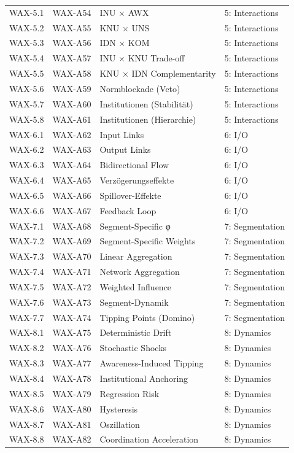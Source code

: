 \begin{longtable}{@{}llll@{}}
WAX-5.1 & WAX-A54 & INU × AWX & 5: Interactions \\
WAX-5.2 & WAX-A55 & KNU × UNS & 5: Interactions \\
WAX-5.3 & WAX-A56 & IDN × KOM & 5: Interactions \\
WAX-5.4 & WAX-A57 & INU × KNU Trade-off & 5: Interactions \\
WAX-5.5 & WAX-A58 & KNU × IDN Complementarity & 5: Interactions \\
WAX-5.6 & WAX-A59 & Normblockade (Veto) & 5: Interactions \\
WAX-5.7 & WAX-A60 & Institutionen (Stabilität) & 5: Interactions \\
WAX-5.8 & WAX-A61 & Institutionen (Hierarchie) & 5: Interactions \\
\midrule

WAX-6.1 & WAX-A62 & Input Links & 6: I/O \\
WAX-6.2 & WAX-A63 & Output Links & 6: I/O \\
WAX-6.3 & WAX-A64 & Bidirectional Flow & 6: I/O \\
WAX-6.4 & WAX-A65 & Verzögerungseffekte & 6: I/O \\
WAX-6.5 & WAX-A66 & Spillover-Effekte & 6: I/O \\
WAX-6.6 & WAX-A67 & Feedback Loop & 6: I/O \\
\midrule

WAX-7.1 & WAX-A68 & Segment-Specific φ & 7: Segmentation \\
WAX-7.2 & WAX-A69 & Segment-Specific Weights & 7: Segmentation \\
WAX-7.3 & WAX-A70 & Linear Aggregation & 7: Segmentation \\
WAX-7.4 & WAX-A71 & Network Aggregation & 7: Segmentation \\
WAX-7.5 & WAX-A72 & Weighted Influence & 7: Segmentation \\
WAX-7.6 & WAX-A73 & Segment-Dynamik & 7: Segmentation \\
WAX-7.7 & WAX-A74 & Tipping Points (Domino) & 7: Segmentation \\
\midrule

WAX-8.1 & WAX-A75 & Deterministic Drift & 8: Dynamics \\
WAX-8.2 & WAX-A76 & Stochastic Shocks & 8: Dynamics \\
WAX-8.3 & WAX-A77 & Awareness-Induced Tipping & 8: Dynamics \\
WAX-8.4 & WAX-A78 & Institutional Anchoring & 8: Dynamics \\
WAX-8.5 & WAX-A79 & Regression Risk & 8: Dynamics \\
WAX-8.6 & WAX-A80 & Hysteresis & 8: Dynamics \\
WAX-8.7 & WAX-A81 & Oszillation & 8: Dynamics \\
WAX-8.8 & WAX-A82 & Coordination Acceleration & 8: Dynamics \\
\midrule


\end{longtable}
